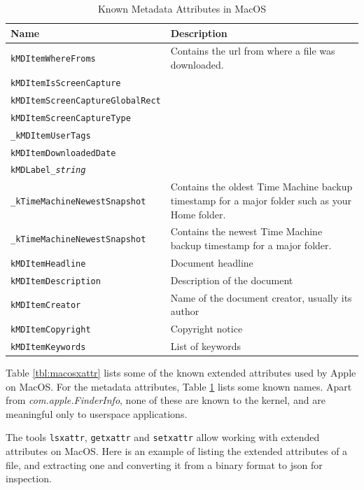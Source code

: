 \documentclass[a4paper]{article}
\begin{document}


\begin{table}
\centering
\caption{Known Metadata Attributes in MacOS}
\label{tbl:macosmetaattr}
\begin{tabular}{@{}lp{6cm}@{}}
\toprule
Name & Description\\
\midrule
\texttt{kMDItemWhereFroms} & Contains the \gls{url} from where a file was downloaded.\\
\texttt{kMDItemIsScreenCapture} & \\
\texttt{kMDItemScreenCaptureGlobalRect} & \\
\texttt{kMDItemScreenCaptureType} & \\
\texttt{\_kMDItemUserTags} & \\
\texttt{kMDItemDownloadedDate} & \\
\texttt{kMDLabel\_\emph{string}} & \\
\texttt{\_kTimeMachineNewestSnapshot} & Contains the oldest Time Machine backup timestamp for a major folder such as your Home folder.\\
\texttt{\_kTimeMachineNewestSnapshot} & Contains the newest Time Machine backup timestamp for a major folder.\\
\texttt{kMDItemHeadline} & Document headline\\
\texttt{kMDItemDescription} & Description of the document\\
\texttt{kMDItemCreator} & Name of the document creator, usually its author\\
\texttt{kMDItemCopyright} & Copyright notice\\
\texttt{kMDItemKeywords} &  List of keywords\\
\bottomrule
\end{tabular}
\end{table}

Table \ref{tbl:macosxattr} lists some of the known extended attributes used by Apple on MacOS. For the metadata attributes, Table \ref{tbl:macosmetaattr} lists some known names. Apart from \emph{com.apple.FinderInfo}, none of these are known to the kernel, and are meaningful only to userspace applications.

The tools \verb|lsxattr|, \verb|getxattr| and \verb|setxattr| allow working with extended attributes on MacOS. Here is an example of listing the extended attributes of a file, and extracting one and converting it from a binary format to \gls{json} for inspection.
\end{document}
